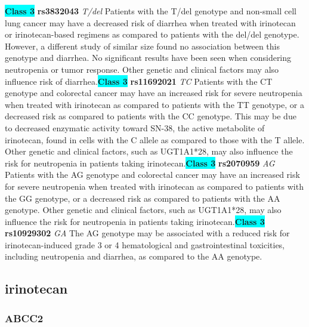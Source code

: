 \documentclass{book}
\begin{document}
\begin{center}
\textbf{\colorbox{cyan} {Class 3}} \textbf{ rs3832043 } \textit{ T/del }
Patients with the T/del genotype and non-small cell lung cancer may have a decreased risk of diarrhea when treated with irinotecan or irinotecan-based regimens as compared to patients with the del/del genotype. However, a different study of similar size found no association between this genotype and diarrhea. No significant results have been seen when considering neutropenia or tumor response. Other genetic and clinical factors may also influence risk of diarrhea.\textbf{\colorbox{cyan} {Class 3}} \textbf{ rs11692021 } \textit{ TC }
Patients with the CT genotype and colorectal cancer may have an increased risk for severe neutropenia when treated with irinotecan as compared to patients with the TT genotype, or a decreased risk as compared to patients with the CC genotype. This may be due to decreased enzymatic activity toward SN-38, the active metabolite of irinotecan, found in cells with the C allele as compared to those with the T allele. Other genetic and clinical factors, such as UGT1A1*28, may also influence the risk for neutropenia in patients taking irinotecan.\textbf{\colorbox{cyan} {Class 3}} \textbf{ rs2070959 } \textit{ AG }
Patients with the AG genotype and colorectal cancer may have an increased risk for severe neutropenia when treated with irinotecan as compared to patients with the GG genotype, or a decreased risk as compared to patients with the AA genotype. Other genetic and clinical factors, such as UGT1A1*28, may also influence the risk for neutropenia in patients taking irinotecan.\textbf{\colorbox{cyan} {Class 3}} \textbf{ rs10929302 } \textit{ GA }
The AG genotype may be associated with a reduced risk for irinotecan-induced grade 3 or 4 hematological and gastrointestinal toxicities, including neutropenia and diarrhea, as compared to the AA genotype. 


\end{center}\subsection{ irinotecan }


\subsubsection{ ABCC2 }
\end{document}
